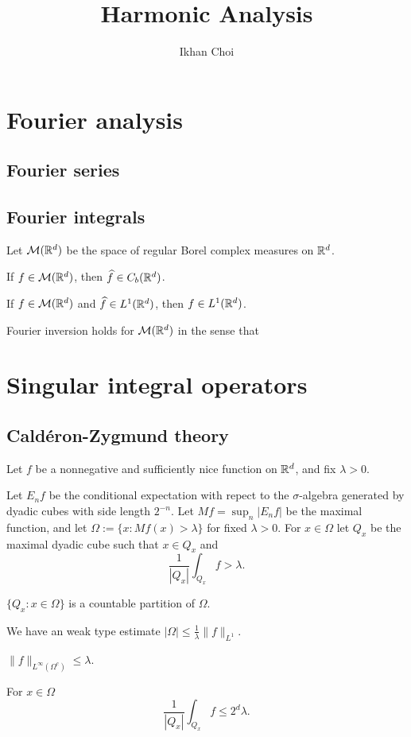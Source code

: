 \documentclass{../note}
\begin{document}
\title{Harmonic Analysis}
\author{Ikhan Choi}
\maketitle
\tableofcontents

\part{Fourier analysis}
\chapter{Fourier series}
\chapter{Fourier integrals}



\begin{prb}
Let $\mathcal{M}(\mathbb{R}^d)$ be the space of regular Borel complex measures on $\mathbb{R}^d$.
\begin{parts}
\item If $f\in\mathcal{M}(\mathbb{R}^d)$, then $\widehat f\in C_b(\mathbb{R}^d)$.
\item If $f\in\mathcal{M}(\mathbb{R}^d)$ and $\widehat f\in L^1(\mathbb{R}^d)$, then $f\in L^1(\mathbb{R}^d)$.
\item Fourier inversion holds for $\mathcal{M}(\mathbb{R}^d)$ in the sense that
\end{parts}
\end{prb}

\part{Singular integral operators}
\chapter{Cald\'eron-Zygmund theory}

Let $f$ be a nonnegative and sufficiently nice function on $\mathbb{R}^d$, and fix $\lambda>0$.

\begin{prb}
Let $E_nf$ be the conditional expectation with repect to the $\sigma$-algebra generated by dyadic cubes with side length $2^{-n}$.
Let $Mf=\sup_n|E_nf|$ be the maximal function, and let $\Omega:=\{x:Mf(x)>\lambda\}$ for fixed $\lambda>0$.
For $x\in\Omega$ let $Q_x$ be the maximal dyadic cube such that $x\in Q_x$ and
\[\frac1{|Q_x|}\int_{Q_x}f>\lambda.\]
\begin{parts}
\item
$\{Q_x:x\in\Omega\}$ is a countable partition of $\Omega$.
\item
We have an weak type estimate $|\Omega|\le\frac1\lambda\|f\|_{L^1}$.
\item
$\|f\|_{L^\infty(\Omega^c)}\le\lambda$.
\item
For $x\in\Omega$
\[\frac1{|Q_x|}\int_{Q_x}f\le2^d\lambda.\]
\end{parts}
\end{prb}
\end{document}
